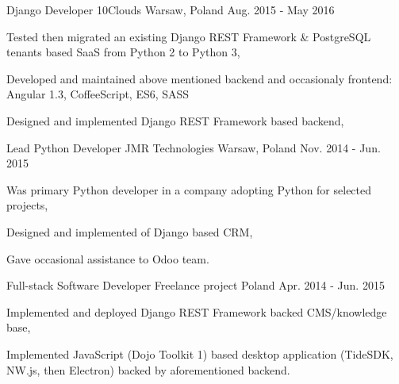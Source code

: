 \begin{cventries}
  \cventry
  {Django Developer} %
  {10Clouds} %
  {Warsaw, Poland} %
  {Aug. 2015 - May 2016} %
  {
    \begin{cvitems} %
      \item {Tested then migrated an existing Django REST Framework \& PostgreSQL tenants based SaaS from Python 2 to Python 3,}
      \item {Developed and maintained above mentioned backend and occasionaly frontend: Angular 1.3, CoffeeScript, ES6, SASS}
      \item {Designed and implemented Django REST Framework based backend,}
    \end{cvitems}
  }

  \cventry
  {Lead Python Developer} %
  {JMR Technologies} %
  {Warsaw, Poland} %
  {Nov. 2014 - Jun. 2015} %
  {
    \begin{cvitems} %
      \item {Was primary Python developer in a company adopting Python for selected projects,}
      \item {Designed and implemented of Django based CRM,}
      \item {Gave occasional assistance to Odoo team.}
    \end{cvitems}
  }

  \cventry
  {Full-stack Software Developer} %
  {Freelance project} %
  {Poland} %
  {Apr. 2014 - Jun. 2015} %
  {
    \begin{cvitems} %
      \item {Implemented and deployed Django REST Framework backed CMS/knowledge base,}
      \item {Implemented JavaScript (Dojo Toolkit 1) based desktop application (TideSDK, NW.js, then Electron) backed by aforementioned backend.}
    \end{cvitems}
  }


\end{cventries}
